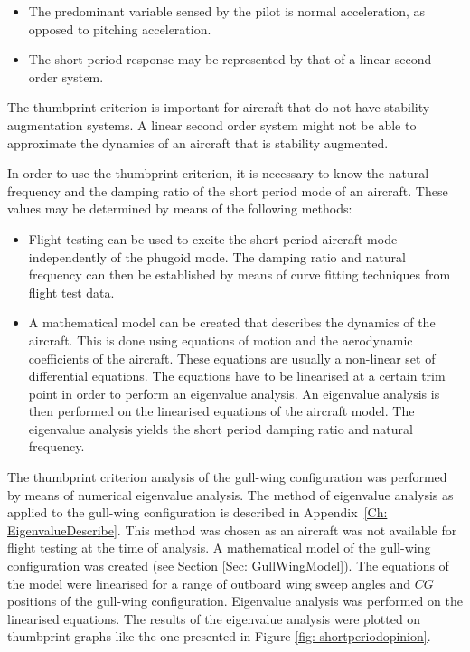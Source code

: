 \documentclass{report}
\begin{document}
\begin{itemize}
	\item{The predominant variable sensed by the pilot is normal acceleration, as opposed to pitching acceleration.}
	\item{The short period response may be represented by that of a linear second order system.}
\end{itemize}

The thumbprint criterion is important for aircraft that do not have stability augmentation systems.  A linear second order system might not be able to approximate the dynamics of an aircraft that is stability augmented.

In order to use the thumbprint criterion, it is necessary to know the natural frequency and the damping ratio of the short period mode of an aircraft.  These values may be determined by means of the following methods:

\begin{itemize} 
	\item{Flight testing can be used to excite the short period aircraft mode independently of the phugoid mode.  The damping ratio and natural frequency can then be established by means of curve fitting techniques from flight test data.}
	\item{A mathematical model can be created that describes the dynamics of the aircraft.  This is done using equations of motion and the aerodynamic coefficients of the aircraft.  These equations are usually a non-linear set of differential equations.  The equations have to be linearised at a certain trim point in order to perform an eigenvalue analysis.  An eigenvalue analysis is then performed on the linearised equations of the aircraft model.  The eigenvalue analysis yields the short period damping ratio and natural frequency.}
\end{itemize}

The thumbprint criterion analysis of the gull-wing configuration was performed by means of numerical eigenvalue analysis.  The method of eigenvalue analysis as applied to the gull-wing configuration is described in \mbox{Appendix \ref{Ch: EigenvalueDescribe}}.  This method was chosen as an aircraft was not available for flight testing at the time of analysis.  A mathematical model of the gull-wing configuration was created (see Section \ref{Sec: GullWingModel}).  The equations of the model were linearised for a range of outboard wing sweep angles and $CG$ positions of the gull-wing configuration.  Eigenvalue analysis was performed on the linearised equations.  The results of the eigenvalue analysis were plotted on thumbprint graphs like the one presented in Figure \ref{fig: shortperiodopinion}.  
\end{document}
